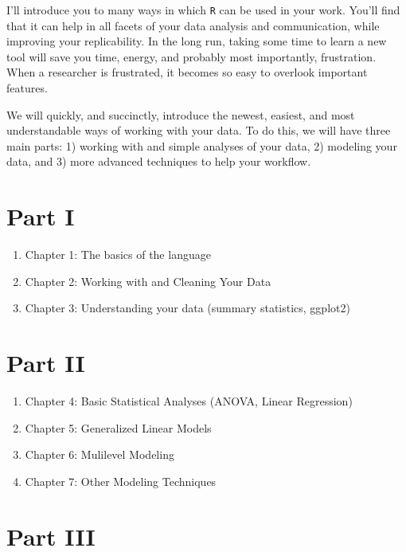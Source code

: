 \documentclass[]{tufte-book}
\providecommand{\tightlist}{%
  \setlength{\itemsep}{0pt}\setlength{\parskip}{0pt}}
\theoremstyle{definition}
\theoremstyle{definition}
\theoremstyle{remark}
\begin{document}
I'll introduce you to many ways in which \texttt{R} can be used in your
work. You'll find that it can help in all facets of your data analysis
and communication, while improving your replicability. In the long run,
taking some time to learn a new tool will save you time, energy, and
probably most importantly, frustration. When a researcher is frustrated,
it becomes so easy to overlook important features.

We will quickly, and succinctly, introduce the newest, easiest, and most
understandable ways of working with your data. To do this, we will have
three main parts: 1) working with and simple analyses of your data, 2)
modeling your data, and 3) more advanced techniques to help your
workflow.

\section*{Part I}\label{part-i}

\begin{enumerate}
\def\labelenumi{\arabic{enumi}.}
\tightlist
\item
  Chapter 1: The basics of the language
\item
  Chapter 2: Working with and Cleaning Your Data
\item
  Chapter 3: Understanding your data (summary statistics, ggplot2)
\end{enumerate}

\section*{Part II}\label{part-ii}

\begin{enumerate}
\def\labelenumi{\arabic{enumi}.}
\setcounter{enumi}{3}
\tightlist
\item
  Chapter 4: Basic Statistical Analyses (ANOVA, Linear Regression)
\item
  Chapter 5: Generalized Linear Models
\item
  Chapter 6: Mulilevel Modeling
\item
  Chapter 7: Other Modeling Techniques
\end{enumerate}

\section*{Part III}\label{part-iii}
\end{document}
